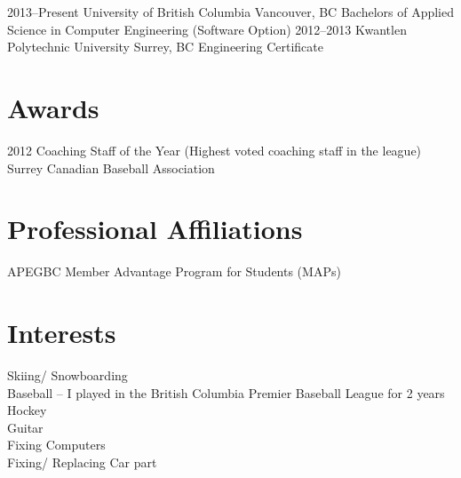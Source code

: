 \documentclass[]{friggeri-cv} %
\begin{document}
\begin{entrylist}
\entry
{2013--Present}
{University of British Columbia}
{Vancouver, BC}
{Bachelors of Applied Science in Computer Engineering (Software Option)}
\entry
{2012--2013}
{Kwantlen Polytechnic University} %
{Surrey, BC}
{Engineering Certificate}
\end{entrylist}


\section{Awards}

\begin{entrylist}
\entry
{2012}
{Coaching Staff of the Year (Highest voted coaching staff in the league)}
{}
{Surrey Canadian Baseball Association}
\end{entrylist}


\section{Professional Affiliations}
\begin{entrylist}
\entry
{}
{APEGBC Member Advantage Program for Students (MAPs)}
{}
{}
\end{entrylist}


\section{Interests}

Skiing/ Snowboarding \\
Baseball – I played in the British Columbia Premier Baseball League for 2 years \\
Hockey \\
Guitar \\
Fixing Computers \\
Fixing/ Replacing Car part \\
\end{document}
